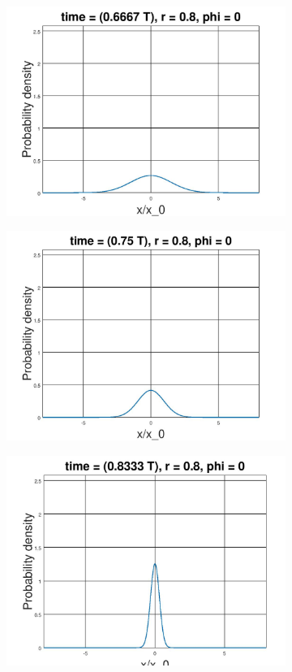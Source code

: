\documentclass[12pt, twoside]{article}
\begin{document}
\begin{figure}[h!]
\begin{subfigure}[h!]{0.3\linewidth}
		\includegraphics[width=\linewidth]{graphs/squeezed_vacuum/8.jpg}
	\end{subfigure}
	\begin{subfigure}[h!]{0.3\linewidth}
		\includegraphics[width=\linewidth]{graphs/squeezed_vacuum/9.jpg}
	\end{subfigure}
	\begin{subfigure}[h!]{0.3\linewidth}
		\includegraphics[width=\linewidth]{graphs/squeezed_vacuum/10.jpg}

\end{subfigure}
\end{figure}
\end{document}
